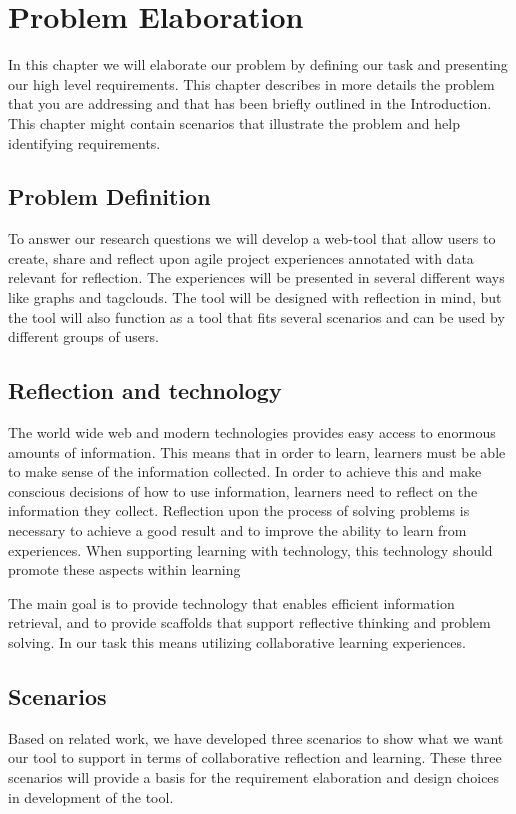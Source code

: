 \chapter{Problem Elaboration}
\label{problemelaboration}
In this chapter we will elaborate our problem by defining our task and presenting our high level requirements.
This chapter describes in more details the problem that you are addressing and that
has been briefly outlined in the Introduction. This chapter might contain scenarios that
illustrate the problem and help identifying requirements.

\section{Problem Definition}
\label{problemdefinition}

To answer our research questions we will develop a web-tool that allow users to create, share and reflect upon agile project experiences annotated with data relevant for reflection. 
The experiences will be presented in several different ways like graphs and tagclouds. The tool will be designed with reflection in mind, but the tool will also function as 
a tool that fits several scenarios and can be used by different groups of users. 

\section{Reflection and technology}
The world wide web and modern technologies provides easy access to enormous amounts of information. This means that in order to learn, learners must be able to make sense of the information collected.  
In order to achieve this and make conscious decisions of how to use information, learners need to reflect on the information they collect. Reflection upon the process of solving problems is necessary to achieve a good result and to improve the ability to learn from experiences. When supporting learning with technology, this technology should promote these aspects within learning\cite{Lin1999}

The main goal is to provide technology that enables efficient information retrieval, and to provide scaffolds that support reflective thinking and problem solving. In our task this means utilizing collaborative learning experiences. 

\section{Scenarios}
\label{problemdefinition}
Based on related work, we have developed three scenarios to show what we want our tool to support in terms of collaborative reflection and learning. These three scenarios will provide a basis for the requirement elaboration and design choices in development of the tool. 
\\

